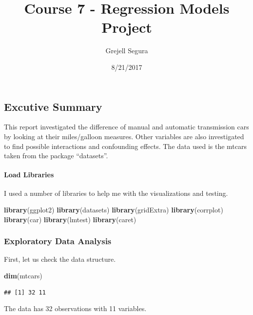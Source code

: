 \documentclass[]{article}
\title{Course 7 - Regression Models Project}
\author{Grejell Segura}
\date{8/21/2017}
\newenvironment{Shaded}{\begin{snugshade}}{\end{snugshade}}
\newcommand{\KeywordTok}[1]{\textcolor[rgb]{0.13,0.29,0.53}{\textbf{#1}}}
\newcommand{\NormalTok}[1]{#1}
\let\oldparagraph\paragraph
\renewcommand{\paragraph}[1]{\oldparagraph{#1}\mbox{}}
\begin{document}
\maketitle

\subsection{Excutive Summary}\label{excutive-summary}

This report investigated the difference of manual and automatic
transmission cars by looking at their miles/galloon measures. Other
variables are also investigated to find possible interactions and
confounding effects. The data used is the mtcars taken from the package
``datasets''.

\paragraph{Load Libraries}\label{load-libraries}

I used a number of libraries to help me with the visualizations and
testing.

\begin{Shaded}
\begin{Highlighting}[]
\KeywordTok{library}\NormalTok{(ggplot2)}
\KeywordTok{library}\NormalTok{(datasets)}
\KeywordTok{library}\NormalTok{(gridExtra)}
\KeywordTok{library}\NormalTok{(corrplot)}
\KeywordTok{library}\NormalTok{(car)}
\KeywordTok{library}\NormalTok{(lmtest)}
\KeywordTok{library}\NormalTok{(caret)}
\end{Highlighting}
\end{Shaded}

\subsubsection{Exploratory Data
Analysis}\label{exploratory-data-analysis}

First, let us check the data structure.

\begin{Shaded}
\begin{Highlighting}[]
\KeywordTok{dim}\NormalTok{(mtcars)}
\end{Highlighting}
\end{Shaded}

\begin{verbatim}
## [1] 32 11
\end{verbatim}

The data has 32 observations with 11 variables.
\end{document}
